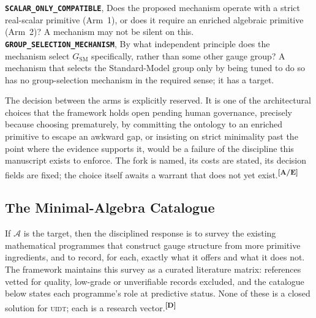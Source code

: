 \documentclass[12pt,a4paper,twoside]{article}
\theoremstyle{plain}
\theoremstyle{definition}
\theoremstyle{remark}
\newcommand{\UIDT}{\textsc{uidt}}
\newcommand{\catmark}[1]{\textsuperscript{\textsf{\textbf{[#1]}}}}
\begin{document}
\begin{governancebox}
\textbf{\texttt{SCALAR\_ONLY\_COMPATIBLE}}, Does the proposed mechanism operate with a strict real-scalar primitive (Arm~1), or does it require an enriched
algebraic primitive (Arm~2)? A mechanism may not be silent on this.\\[0.4em]
\textbf{\texttt{GROUP\_SELECTION\_MECHANISM}}, By what independent principle does the mechanism select $G_{\mathrm{SM}}$ specifically, rather than some other gauge group? A mechanism that selects the Standard-Model group only by being tuned to do so has no group-selection mechanism in the required sense; it has a target.
\end{governancebox}

\noindent The decision between the arms is explicitly reserved. It is one of the architectural choices that the framework holds open pending human governance, precisely because choosing prematurely, by committing the ontology to an enriched primitive to escape an awkward gap, or insisting on strict minimality past the point where the evidence supports it, would be a failure of the discipline this manuscript exists to enforce. The fork is named, its costs are stated, its decision fields are fixed; the choice itself awaits a warrant that does not yet exist.\catmark{A/E}

\subsection{The Minimal-Algebra Catalogue}
\label{subsec:minimal-algebra-catalogue}

If $\mathcal{A}$ is the target, then the disciplined response is to survey the existing mathematical programmes that construct gauge structure from more primitive ingredients, and to record, for each, exactly what it offers and what it does not. The framework maintains this survey as a curated literature matrix: references vetted for quality, low-grade or unverifiable records excluded, and the catalogue below states each programme's role at predictive status. None of these is a closed solution for \UIDT; each is a research vector.\catmark{D}
\end{document}
